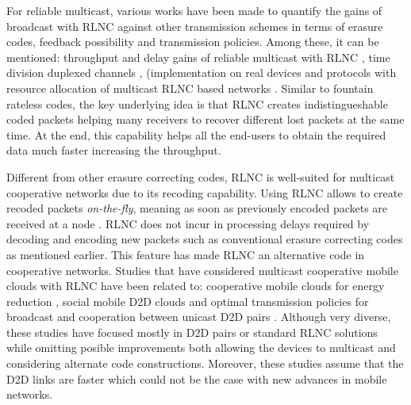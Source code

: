 For reliable multicast, various works have been made to quantify the gains of broadcast with \ac{RLNC} against other transmission schemes in terms of erasure codes, feedback possibility and transmission policies. Among these, it can be mentioned: throughput and delay gains of reliable multicast with \ac{RLNC} \cite{eryilmaz2008delay}, time division duplexed channels \cite{lucani2009random,lucani2009queue}, (implementation on real devices \cite{heide2009network} and protocols with resource allocation of multicast \ac{RLNC} based networks \cite{vukobratovic2014random,chiti2013optimized,tassi2015resource}. Similar to fountain rateless codes, the key underlying idea is that \ac{RLNC} creates indistingueshable coded packets helping many receivers to recover different lost packets at the same time. At the end, this capability helps all the end-users to obtain the required data much faster increasing the throughput.

Different from other erasure correcting codes, \ac{RLNC} is well-suited for multicast cooperative networks due to its recoding capability. Using \ac{RLNC} allows to create recoded packets \textit{on-the-fly}, meaning as soon as previously encoded packets are received at a node \cite{sundararajan2008online,lucani2010online,toemoeskoezi2015packet}. \ac{RLNC} does not incur in processing delays required by decoding and encoding new packets such as conventional erasure correcting codes as mentioned earlier. This feature has made \ac{RLNC} an alternative code in cooperative networks. Studies that have considered multicast cooperative mobile clouds with \ac{RLNC} have been related to: cooperative mobile clouds for energy reduction \cite{heide2012green}, social mobile \ac{D2D} clouds \cite{fitzek2013implementation} and optimal transmission policies for broadcast and cooperation between unicast \ac{D2D} pairs \cite{khamfroush2013minimizing,khamfroush2015optimal}. Although very diverse, these studies have focused mostly in \ac{D2D} pairs or standard \ac{RLNC} solutions while omitting posible improvements both allowing the devices to multicast and considering alternate code constructions. Moreover, these studies assume that the \ac{D2D} links are faster which could not be the case with new advances in mobile networks.

\clearpage
